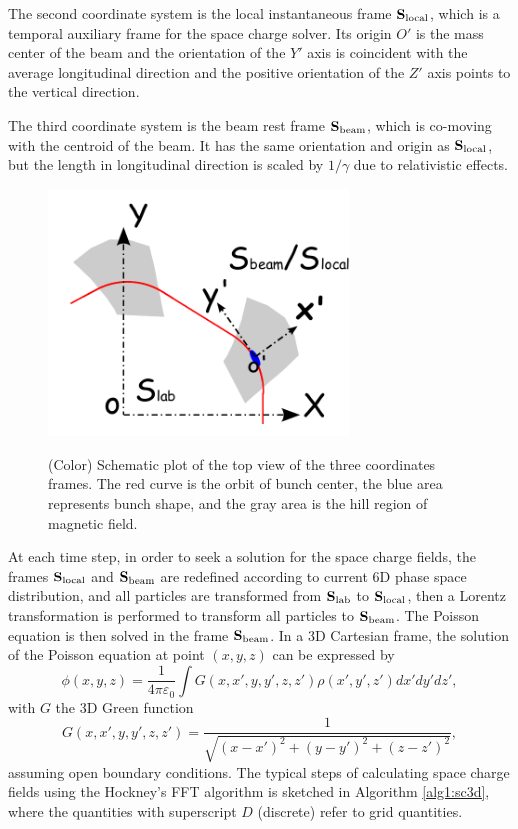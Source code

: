 \documentclass[aps,prstab,onecolumn,superscriptaddress,showpacs]{revtex4}
\newcommand{\bs}[1]{\mathbf #1}
\begin{document}
The second coordinate system is the local instantaneous frame ${\bs{S}_{\RM{local}}}$, which is a temporal auxiliary frame for the space charge solver.
Its origin $O'$ is the mass center of the beam and the orientation of the $Y'$ axis is coincident with the average longitudinal direction and 
the positive orientation of the $Z'$ axis points to the vertical direction.

The third coordinate system is the beam rest frame $\bs{S}_{\RM{beam}}$, which is co-moving with the centroid of the beam. 
It has the same orientation and origin as ${\bs{S}_{\RM{local}}}$, but the length in longitudinal 
direction is scaled by $1/\gamma$ due to relativistic effects. 
  \begin{figure}
    {\includegraphics[width=8cm]{figures/SM-frame.pdf}}
    \caption{(Color) Schematic plot of the top view of the three coordinates frames. The red curve is the orbit of bunch center, 
      the blue area represents bunch shape, and the gray area is the hill region of magnetic field.}
    \label{fig:frame}
  \end{figure}

At each time step, in order to seek a solution for the space charge fields, the frames $\bs{S}_{\RM{local}}$ and $\bs{S}_{\RM{beam}}$ are redefined according to current 6D 
phase space distribution, and all particles are transformed from $\bs{S}_{\RM{lab}}$ to $\bs{S}_{\RM{local}}$, 
then a Lorentz transformation is performed to transform all particles to $\bs{S}_{\RM{beam}}$.
The Poisson equation is then solved in the frame $\bs{S}_{\RM{beam}}$. In a 3D Cartesian frame, the solution of the Poisson equation at point $(x,y,z)$ can be expressed by 
\begin{equation}\label{eq:Poten}
  \phi(x,y,z)= \frac{1}{4\pi\varepsilon_0}\int{G(x,x',y,y',z,z')\rho(x',y',z')dx'dy'dz'},
\end{equation}
with $G$ the 3D Green function 
\begin{equation}\label{eq:Green}
  G(x,x',y,y',z,z')= \frac{1}{\sqrt{(x-x')^2+(y-y')^2+(z-z')^2}},
\end{equation}
assuming open boundary conditions.
The typical steps of calculating space charge fields using the Hockney's FFT algorithm \cite{Hockney:1} is sketched in Algorithm \ref{alg1:sc3d},
where the quantities with superscript $D$ (discrete) refer to grid quantities.
\end{document}
